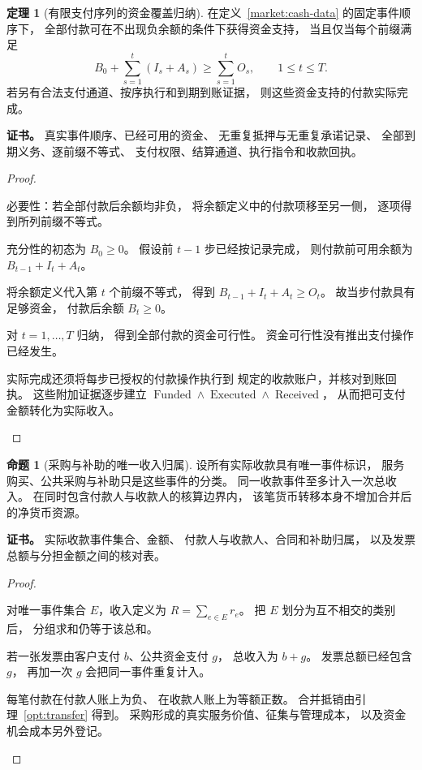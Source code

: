 \documentclass[UTF8,12pt,a4paper,openany,fontset=none,zihao=false]{ctexrep}
\theoremstyle{definition}
\newtheorem{theorem}{定理}[chapter]
\newtheorem{proposition}{命题}[chapter]
\newenvironment{certificate}{\par\noindent\textbf{证书。}\ignorespaces}{\par}
\newcommand{\1}{\mathbf 1}
\begin{document}
\begin{theorem}[有限支付序列的资金覆盖归纳]
\label{market:prefix-cash}
在定义~\ref{market:cash-data} 的固定事件顺序下，
全部付款可在不出现负余额的条件下获得资金支持，
当且仅当每个前缀满足
\[
 B_0+\sum_{s=1}^t(I_s+A_s)
 \ge\sum_{s=1}^tO_s,
 \qquad 1\le t\le T.
\]
若另有合法支付通道、按序执行和到期到账证据，
则这些资金支持的付款实际完成。
\end{theorem}
\begin{certificate}
真实事件顺序、已经可用的资金、
无重复抵押与无重复承诺记录、
全部到期义务、逐前缀不等式、
支付权限、结算通道、执行指令和收款回执。
\end{certificate}
\begin{proof}
\begin{semanticsteps}
\item 必要性：若全部付款后余额均非负，
将余额定义中的付款项移至另一侧，
逐项得到所列前缀不等式。
\item 充分性的初态为 \(B_0\ge0\)。
假设前 \(t-1\) 步已经按记录完成，
则付款前可用余额为
\(B_{t-1}+I_t+A_t\)。
\item 将余额定义代入第 \(t\) 个前缀不等式，
得到
\(B_{t-1}+I_t+A_t\ge O_t\)。
故当步付款具有足够资金，
付款后余额 \(B_t\ge0\)。
\item 对 \(t=1,\ldots,T\) 归纳，
得到全部付款的资金可行性。
资金可行性没有推出支付操作已经发生。
\item 实际完成还须将每步已授权的付款操作执行到
规定的收款账户，并核对到账回执。
这些附加证据逐步建立
\(\operatorname{Funded}\land\operatorname{Executed}
\land\operatorname{Received}\)，
从而把可支付金额转化为实际收入。
\end{semanticsteps}
\end{proof}

\begin{proposition}[采购与补助的唯一收入归属]
\label{market:transfer-once}
设所有实际收款具有唯一事件标识，
服务购买、公共采购与补助只是这些事件的分类。
同一收款事件至多计入一次总收入。
在同时包含付款人与收款人的核算边界内，
该笔货币转移本身不增加合并后的净货币资源。
\end{proposition}
\begin{certificate}
实际收款事件集合、金额、
付款人与收款人、合同和补助归属，
以及发票总额与分担金额之间的核对表。
\end{certificate}
\begin{proof}
\begin{semanticsteps}
\item 对唯一事件集合 \(E\)，收入定义为
\(R=\sum_{e\in E}r_e\)。
把 \(E\) 划分为互不相交的类别后，
分组求和仍等于该总和。
\item 若一张发票由客户支付 \(b\)、公共资金支付 \(g\)，
总收入为 \(b+g\)。
发票总额已经包含 \(g\)，
再加一次 \(g\) 会把同一事件重复计入。
\item 每笔付款在付款人账上为负、
在收款人账上为等额正数。
合并抵销由引理~\ref{opt:transfer} 得到。
采购形成的真实服务价值、征集与管理成本，
以及资金机会成本另外登记。
\end{semanticsteps}
\end{proof}
\end{document}
